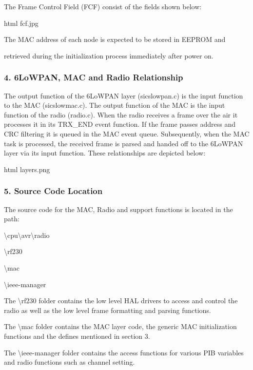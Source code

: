 The Frame Control Field (F\+CF) consist of the fields shown below\+: \begin{DoxyVerb}\image html fcf.jpg

\note The MAC address of each node is expected to be stored in EEPROM and
\end{DoxyVerb}
 retrieved during the initialization process immediately after power on.\hypertarget{a00069_macrelationship}{}\subsubsection{4. 6\+Lo\+W\+P\+A\+N, M\+A\+C and Radio Relationship}\label{a00069_macrelationship}
The output function of the 6\+Lo\+W\+P\+AN layer (sicslowpan.\+c) is the input function to the M\+AC (sicslowmac.\+c). The output function of the M\+AC is the input function of the radio (radio.\+c). When the radio receives a frame over the air it processes it in its T\+R\+X\+\_\+\+E\+ND event function. If the frame passes address and C\+RC filtering it is queued in the M\+AC event queue. Subsequently, when the M\+AC task is processed, the received frame is parsed and handed off to the 6\+Lo\+W\+P\+AN layer via its input function. These relationships are depicted below\+: \begin{DoxyVerb}\image html layers.png
\end{DoxyVerb}
\hypertarget{a00069_maccode}{}\subsubsection{5. Source Code Location}\label{a00069_maccode}
The source code for the M\+AC, Radio and support functions is located in the path\+:
\begin{DoxyItemize}
\item \textbackslash{}cpu\textbackslash{}avr\textbackslash{}radio
\begin{DoxyItemize}
\item \textbackslash{}rf230
\item \textbackslash{}mac
\item \textbackslash{}ieee-\/manager
\end{DoxyItemize}
\end{DoxyItemize}
\begin{DoxyEnumerate}
\item The \textbackslash{}rf230 folder contains the low level H\+AL drivers to access and control the radio as well as the low level frame formatting and parsing functions.
\item The \textbackslash{}mac folder contains the M\+AC layer code, the generic M\+AC initialization functions and the defines mentioned in section 3.
\item The \textbackslash{}ieee-\/manager folder contains the access functions for various P\+IB variables and radio functions such as channel setting.
\end{DoxyEnumerate}

